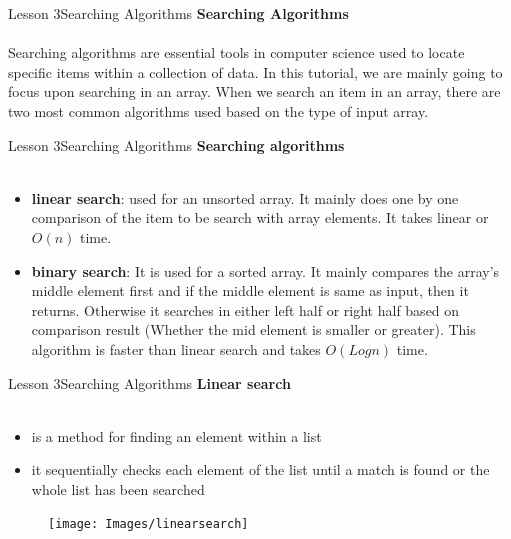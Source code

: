 \documentclass[aspectratio=1610]{beamer}
\begin{document}
\begin{frame}{Lesson 3}{Searching Algorithms}
\LARGE
\textbf{Searching Algorithms}\\~\\
Searching algorithms are essential tools in computer science used to locate specific items 
within a collection of data. In this tutorial, we are mainly going to focus upon searching 
in an array. When we search an item in an array, there are two most common algorithms used 
based on the type of input array.
\end{frame}



\begin{frame}{Lesson 3}{Searching Algorithms}
\LARGE
\textbf{Searching algorithms}\\~\\
\Large
\begin{itemize}
	\item \textbf{linear search}: used for an unsorted array. It mainly does one by one comparison of the item to be search with array elements. It takes linear or $O(n)$ time.
	\item \textbf{binary search}: It is used for a sorted array. It mainly compares the array's middle element first and if the middle element is same as input, then it returns. Otherwise it searches in either left half or right half based on comparison result (Whether the mid element is smaller or greater). This algorithm is faster than linear search and takes $O(Log n)$ time.
\end{itemize}
\end{frame}



\begin{frame}{Lesson 3}{Searching Algorithms}
\LARGE
\textbf{Linear search}\\~\\
\begin{minipage}{0.65\textwidth}
\Large
\begin{itemize}
    \item is a method for finding an element within a list
    \item it sequentially checks each element of the list until a match is found or the whole list has been searched
 \end{itemize}
  \end{minipage}
\begin{minipage}{.0\textwidth}
      \begin{figure}
        \texttt{[image: Images/linearsearch]}
      \end{figure}
  \end{minipage}  
\end{frame}
\end{document}
